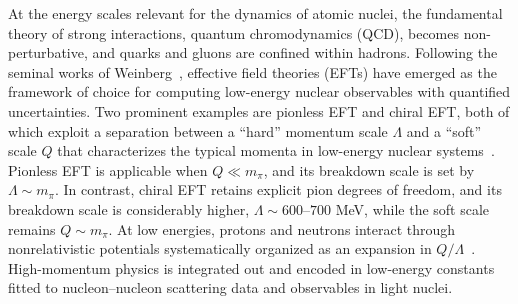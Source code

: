 
At the energy scales relevant for the dynamics of atomic nuclei, the fundamental theory of strong interactions, quantum chromodynamics (QCD), becomes non-perturbative, and quarks and gluons are confined within hadrons. Following the seminal works of Weinberg~\cite{weinberg_nuclear_1990,weinberg_effective_1991}, effective field theories (EFTs) have emerged as the framework of choice for computing low-energy nuclear observables with quantified uncertainties. Two prominent examples are pionless EFT and chiral EFT, both of which exploit a separation between a ``hard'' momentum scale $\Lambda$ and a ``soft'' scale $Q$ that characterizes the typical momenta in low-energy nuclear systems~\cite{epelbaum_modern_2009,machleidt_chiral_2011}. Pionless EFT is applicable when $Q \ll m_\pi$, and its breakdown scale is set by $\Lambda \sim m_\pi$. In contrast, chiral EFT retains explicit pion degrees of freedom, and its breakdown scale is considerably higher, $\Lambda \sim 600$--$700$ MeV, while the soft scale remains $Q \sim m_\pi$. At low energies, protons and neutrons interact through nonrelativistic potentials systematically organized as an expansion in $Q/\Lambda$~\cite{van_kolck_few_1994,epelbaum_modern_2009,machleidt_chiral_2011}. High-momentum physics is integrated out and encoded in low-energy constants fitted to nucleon--nucleon scattering data and observables in light nuclei. 

